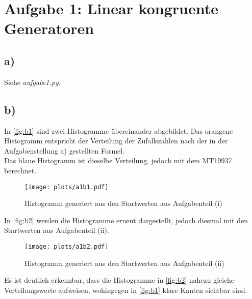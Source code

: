 \newpage
\section{Aufgabe 1: Linear kongruente Generatoren}
\label{sec:auf1}

\subsection{a)}
Siehe \textit{aufgabe1.py}.

\subsection{b)}

In \autoref{fig:b1} sind zwei Histogramme übereinander abgebildet.
Das orangene Histogramm entspricht der Verteilung der Zufallszahlen nach der in der Aufgabenstellung a) gestellten Formel.\\
Das blaue Histogramm ist dieselbe Verteilung, jedoch mit dem MT19937 berechnet.

\begin{figure}[H]
    \centering
    \texttt{[image: plots/a1b1.pdf]}
    \caption{Histogramm generiert aus den Startwerten aus Aufgabenteil (i)}
    \label{fig:b1}
\end{figure}

In \autoref{fig:b2} werden die Histogramme erneut dargestellt, jedoch diesmal mit den Startwerten aus Aufgabenteil (ii).

\begin{figure}[H]
    \centering
    \texttt{[image: plots/a1b2.pdf]}
    \caption{Histogramm generiert aus den Startwerten aus Aufgabenteil (ii)}
    \label{fig:b2}
\end{figure}

Es ist deutlich erkennbar, dass die Histogramme in \autoref{fig:b2} nahezu gleiche Verteilungswerte aufweisen, wohingegen in \autoref{fig:b1} klare Kanten sichtbar sind.